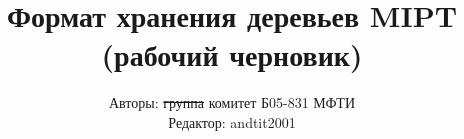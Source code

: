 \documentclass{article}
\title{Формат хранения деревьев MIPT \\ (рабочий черновик)}
\author{Авторы: \st{группа} комитет Б05-831 МФТИ \\ Редактор: andtit2001}
\date{\DTMdate{2019-11-07}}
\begin{document}
\maketitle
\tableofcontents
\pagebreak




\pagebreak

\pagebreak

\end{document}
